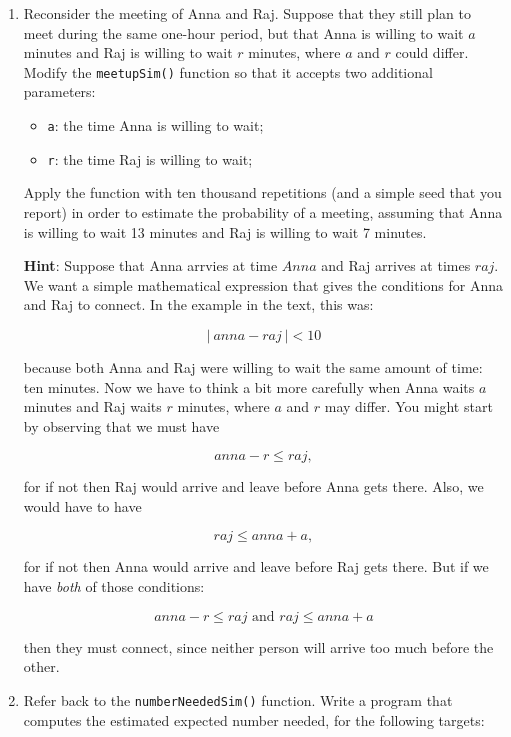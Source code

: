 \documentclass[]{book}
\providecommand{\tightlist}{%
  \setlength{\itemsep}{0pt}\setlength{\parskip}{0pt}}
\theoremstyle{definition}
\theoremstyle{definition}
\theoremstyle{definition}
\theoremstyle{remark}
\begin{document}
{\begin{enumerate}
  \textbf{Note}: Please keep in mind that the fifty-thousand figure is
  just the number of times you repeat your simulations in order to
  estimate the expected value of a \emph{single play} of one of the
  games. It's \textbf{not} how many times you actually get to play
  either game---that's ten thousand.
\item
  Reconsider the meeting of Anna and Raj. Suppose that they still plan
  to meet during the same one-hour period, but that Anna is willing to
  wait \(a\) minutes and Raj is willing to wait \(r\) minutes, where
  \(a\) and \(r\) could differ. Modify the \texttt{meetupSim()} function
  so that it accepts two additional parameters:

  \begin{itemize}
  \tightlist
  \item
    \texttt{a}: the time Anna is willing to wait;
  \item
    \texttt{r}: the time Raj is willing to wait;
  \end{itemize}

  Apply the function with ten thousand repetitions (and a simple seed
  that you report) in order to estimate the probability of a meeting,
  assuming that Anna is willing to wait 13 minutes and Raj is willing to
  wait 7 minutes.

  \textbf{Hint}: Suppose that Anna arrvies at time \(Anna\) and Raj
  arrives at times \(raj\). We want a simple mathematical expression
  that gives the conditions for Anna and Raj to connect. In the example
  in the text, this was:

  \[\vert\ anna - raj \ \vert < 10\]

  because both Anna and Raj were willing to wait the same amount of
  time: ten minutes. Now we have to think a bit more carefully when Anna
  waits \(a\) minutes and Raj waits \(r\) minutes, where \(a\) and \(r\)
  may differ. You might start by observing that we must have

  \[anna - r \le raj,\]

  for if not then Raj would arrive and leave before Anna gets there.
  Also, we would have to have

  \[raj \le anna + a,\]

  for if not then Anna would arrive and leave before Raj gets there. But
  if we have \emph{both} of those conditions:

  \[anna - r \le raj \text{ and } raj \le anna + a\]

  then they must connect, since neither person will arrive too much
  before the other.
\item
  Refer back to the \texttt{numberNeededSim()} function. Write a program
  that computes the estimated expected number needed, for the following
  targets:


\end{enumerate}}
\end{document}
